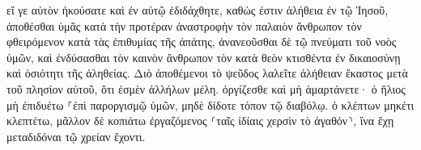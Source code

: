 \documentclass{openreader}
\begin{document}
εἴ γε αὐτὸν ἠκούσατε καὶ ἐν αὐτῷ ἐδιδάχθητε, καθώς ἐστιν ἀλήθεια ἐν τῷ Ἰησοῦ, 
ἀποθέσθαι ὑμᾶς κατὰ τὴν προτέραν ἀναστροφὴν τὸν παλαιὸν ἄνθρωπον τὸν φθειρόμενον κατὰ τὰς ἐπιθυμίας τῆς ἀπάτης, 
ἀνανεοῦσθαι δὲ τῷ πνεύματι τοῦ νοὸς ὑμῶν, 
καὶ ἐνδύσασθαι τὸν καινὸν ἄνθρωπον τὸν κατὰ θεὸν κτισθέντα ἐν δικαιοσύνῃ καὶ ὁσιότητι τῆς ἀληθείας. 
Διὸ ἀποθέμενοι τὸ ψεῦδος λαλεῖτε ἀλήθειαν ἕκαστος μετὰ τοῦ πλησίον αὐτοῦ, ὅτι ἐσμὲν ἀλλήλων μέλη. 
ὀργίζεσθε καὶ μὴ ἁμαρτάνετε· ὁ ἥλιος μὴ ἐπιδυέτω ⸀ἐπὶ παροργισμῷ ὑμῶν, 
μηδὲ δίδοτε τόπον τῷ διαβόλῳ. 
ὁ κλέπτων μηκέτι κλεπτέτω, μᾶλλον δὲ κοπιάτω ἐργαζόμενος ⸂ταῖς ἰδίαις χερσὶν τὸ ἀγαθόν⸃, ἵνα ἔχῃ μεταδιδόναι τῷ χρείαν ἔχοντι. 
\end{document}
